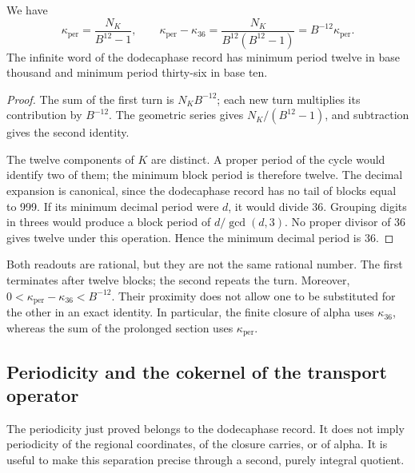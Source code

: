 \begin{proposition}
\label{prop:k-periodo}
We have
\begin{equation}
 \kappa_{\mathrm{per}}=\frac{N_K}{B^{12}-1},\qquad
 \kappa_{\mathrm{per}}-\kappa_{36}
 =\frac{N_K}{B^{12}(B^{12}-1)}
 =B^{-12}\kappa_{\mathrm{per}}.
 \label{eq:k-diferencia-kappas}
\end{equation}
The infinite word of the dodecaphase record has minimum period twelve in base thousand and
minimum period thirty-six in base ten.
\end{proposition}

\begin{proof}
The sum of the first turn is \(N_KB^{-12}\); each new turn
multiplies its contribution by \(B^{-12}\). The geometric series gives
\(N_K/(B^{12}-1)\), and subtraction gives the second identity.

The twelve components of \(K\) are distinct. A proper period of the cycle
would identify two of them; the minimum block period is therefore
twelve. The decimal expansion is canonical, since the dodecaphase record has no tail
of blocks equal to 999. If its minimum decimal period were \(d\), it would divide
36. Grouping digits in threes would produce a block period of
\(d/\gcd(d,3)\). No proper divisor of 36 gives twelve under this
operation. Hence the minimum decimal period is 36.
\end{proof}

Both readouts are rational, but they are not the same rational number. The first
terminates after twelve blocks; the second repeats the turn. Moreover,
\(0<\kappa_{\mathrm{per}}-\kappa_{36}<B^{-12}\). Their proximity does not
allow one to be substituted for the other in an exact identity. In particular,
the finite closure of alpha uses \(\kappa_{36}\), whereas the
sum of the prolonged section uses \(\kappa_{\mathrm{per}}\).



\subsection{Periodicity and the cokernel of the transport operator}
\label{subsec:k-clase-acarreo}

The periodicity just proved belongs to the dodecaphase record. It does not imply
periodicity of the regional coordinates, of the closure carries,
or of alpha. It is useful to make this separation precise through a second,
purely integral quotient.

